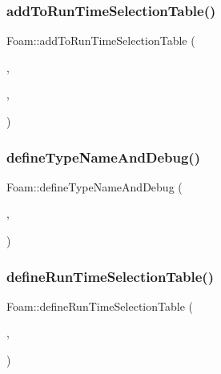 \mbox{\label{namespaceFoam_adb4fa5eccfbd1113ba7d015fe4364197}} 
\subsubsection{\texorpdfstring{add\+To\+Run\+Time\+Selection\+Table()}{addToRunTimeSelectionTable()}\hspace{0.1cm}{\footnotesize\ttfamily [6/6]}}
{\footnotesize\ttfamily Foam\+::add\+To\+Run\+Time\+Selection\+Table (\begin{DoxyParamCaption}\item[{\hyperlink{classFoam_1_1thermoMechanics}{thermo\+Mechanics}}]{,  }\item[{\hyperlink{classFoam_1_1linearElasticThermoMechanics}{linear\+Elastic\+Thermo\+Mechanics}}]{,  }\item[{dictionary}]{ }\end{DoxyParamCaption})}

\mbox{\label{namespaceFoam_a43325727e15421536896e299864adfe6}} 
\subsubsection{\texorpdfstring{define\+Type\+Name\+And\+Debug()}{defineTypeNameAndDebug()}\hspace{0.1cm}{\footnotesize\ttfamily [44/50]}}
{\footnotesize\ttfamily Foam\+::define\+Type\+Name\+And\+Debug (\begin{DoxyParamCaption}\item[{\hyperlink{classFoam_1_1thermoMechanics}{thermo\+Mechanics}}]{,  }\item[{0}]{ }\end{DoxyParamCaption})}

\mbox{\label{namespaceFoam_a8341aa6d9ea0f20113261ed177a72c95}} 
\subsubsection{\texorpdfstring{define\+Run\+Time\+Selection\+Table()}{defineRunTimeSelectionTable()}\hspace{0.1cm}{\footnotesize\ttfamily [27/28]}}
{\footnotesize\ttfamily Foam\+::define\+Run\+Time\+Selection\+Table (\begin{DoxyParamCaption}\item[{\hyperlink{classFoam_1_1thermoMechanics}{thermo\+Mechanics}}]{,  }\item[{dictionary}]{ }\end{DoxyParamCaption})}

